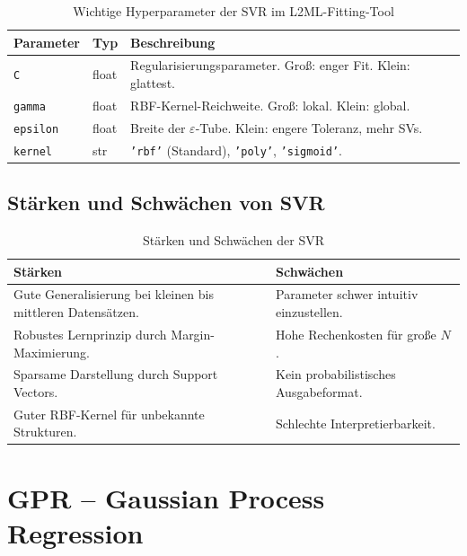 \documentclass[11pt,a4paper]{report}
\begin{document}
\begin{table}[H]
\centering
\caption{Wichtige Hyperparameter der SVR im L2ML-Fitting-Tool}
\label{tab:svr_params}
\begin{tabular}{p{3cm}p{2cm}p{8.5cm}}
\toprule
\textbf{Parameter} & \textbf{Typ} & \textbf{Beschreibung} \\
\midrule
\texttt{C}       & float & Regularisierungsparameter. Gro\ss{}: enger Fit. Klein: glattest. \\
\texttt{gamma}   & float & RBF-Kernel-Reichweite. Gro\ss{}: lokal. Klein: global. \\
\texttt{epsilon} & float & Breite der $\varepsilon$-Tube. Klein: engere Toleranz, mehr SVs. \\
\texttt{kernel}  & str   & \texttt{'rbf'} (Standard), \texttt{'poly'}, \texttt{'sigmoid'}. \\
\bottomrule
\end{tabular}
\end{table}

\section{St\"{a}rken und Schw\"{a}chen von SVR}

\begin{table}[H]
\centering
\caption{St\"{a}rken und Schw\"{a}chen der SVR}
\label{tab:svr_pros_cons}
\begin{tabular}{p{6.5cm}p{6.5cm}}
\toprule
\textbf{St\"{a}rken} & \textbf{Schw\"{a}chen} \\
\midrule
Gute Generalisierung bei kleinen bis mittleren Datens\"{a}tzen. & Parameter schwer intuitiv einzustellen. \\
Robustes Lernprinzip durch Margin-Maximierung. & Hohe Rechenkosten f\"{u}r gro\ss{}e $N$. \\
Sparsame Darstellung durch Support Vectors. & Kein probabilistisches Ausgabeformat. \\
Guter RBF-Kernel f\"{u}r unbekannte Strukturen. & Schlechte Interpretierbarkeit. \\
\bottomrule
\end{tabular}
\end{table}

\chapter{GPR -- Gaussian Process Regression}
\end{document}
